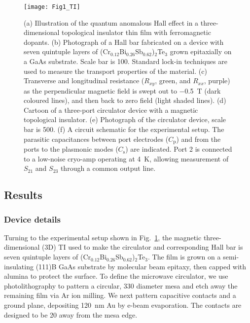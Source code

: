 \begin{figure}
\texttt{[image: Fig1\_TI]}
\caption[A three-dimensional topological insulator based circulator]{\label{fig:fig1_ti}(a) Illustration of the quantum anomalous Hall effect in a three-dimensional topological insulator thin film with ferromagnetic dopants. (b) Photograph of a Hall bar fabricated on a device with seven quintuple layers of (Cr$_{0.12}$Bi$_{0.26}$Sb$_{0.62}$)$_2$Te$_3$ grown epitaxially on a GaAs substrate. Scale bar is \SI{100}{\micron}. Standard lock-in techniques are used to measure the transport properties of the material. (c) Transverse and longitudinal resistance ($R_{xy}$, green, and $R_{xx}$, purple) as the perpendicular magnetic field is swept out to \SI{-0.5}{\tesla} (dark coloured lines), and then back to zero field (light shaded lines). (d) Cartoon of a three-port circulator device with a magnetic topological insulator.  (e) Photograph of the circulator device, scale bar is \SI{500}{\micron}. (f) A circuit schematic for the experimental setup. The parasitic capacitances between port electrodes ($C_\textrm{p}$) and from the ports to the plasmonic modes ($C_\textrm{s}$) are indicated. Port 2 is connected to a low-noise cryo-amp operating at \SI{4}{\kelvin}, allowing measurement of $S_{21}$ and $S_{23}$ through a common output line.}
\end{figure}

\subsection{Results}
\subsubsection{Device details} Turning to the experimental setup shown in Fig.~\ref{fig:fig1_ti}, the magnetic three-dimensional (3D) TI used to make the circulator and corresponding Hall bar is seven quintuple layers of (Cr$_{0.12}$Bi$_{0.26}$Sb$_{0.62}$)$_2$Te$_3$. The film is grown on a semi-insulating (111)B GaAs substrate by molecular beam epitaxy, then capped with alumina to protect the surface. To define the microwave circulator, we use photolithography to pattern a circular, \SI{330}{\micron} diameter mesa and etch away the remaining film via Ar ion milling. We next pattern capacitive contacts and a ground plane, depositing \SI{120}{\nano\meter} Au by e-beam evaporation. The contacts are designed to be \SI{20}{\micron} away from the mesa edge.

